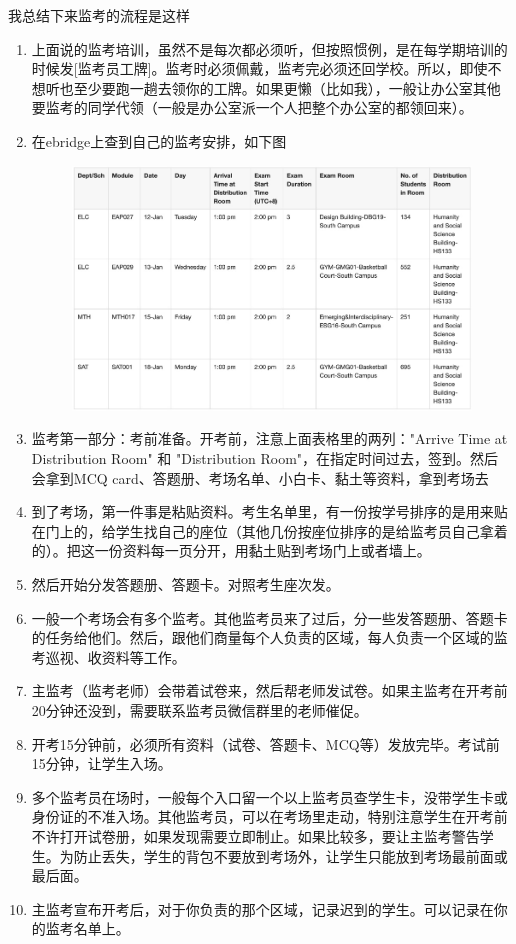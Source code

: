 我总结下来监考的流程是这样
\begin{enumerate}
    \item 上面说的监考培训，虽然不是每次都必须听，但按照惯例，是在每学期培训的时候发[监考员工牌]。监考时必须佩戴，监考完必须还回学校。所以，即使不想听也至少要跑一趟去领你的工牌。如果更懒（比如我），一般让办公室其他要监考的同学代领（一般是办公室派一个人把整个办公室的都领回来）。
    \item 在ebridge上查到自己的监考安排，如下图
        \begin{figure}[H]
            \centering
            \includegraphics[width=0.5\columnwidth]{author-folder/Kai.Wu/invigi-table.jpg}
        \end{figure}
    \item 监考第一部分：考前准备。开考前，注意上面表格里的两列："Arrive Time at Distribution Room" 和 "Distribution Room"，在指定时间过去，签到。然后会拿到MCQ card、答题册、考场名单、小白卡、黏土等资料，拿到考场去
    \item 到了考场，第一件事是粘贴资料。考生名单里，有一份按学号排序的是用来贴在门上的，给学生找自己的座位（其他几份按座位排序的是给监考员自己拿着的）。把这一份资料每一页分开，用黏土贴到考场门上或者墙上。
    \item 然后开始分发答题册、答题卡。对照考生座次发。
    \item 一般一个考场会有多个监考。其他监考员来了过后，分一些发答题册、答题卡的任务给他们。然后，跟他们商量每个人负责的区域，每人负责一个区域的监考巡视、收资料等工作。
    \item 主监考（监考老师）会带着试卷来，然后帮老师发试卷。如果主监考在开考前20分钟还没到，需要联系监考员微信群里的老师催促。
    \item 开考15分钟前，必须所有资料（试卷、答题卡、MCQ等）发放完毕。考试前15分钟，让学生入场。
    \item 多个监考员在场时，一般每个入口留一个以上监考员查学生卡，没带学生卡或身份证的不准入场。其他监考员，可以在考场里走动，特别注意学生在开考前不许打开试卷册，如果发现需要立即制止。如果比较多，要让主监考警告学生。为防止丢失，学生的背包不要放到考场外，让学生只能放到考场最前面或最后面。
    \item 主监考宣布开考后，对于你负责的那个区域，记录迟到的学生。可以记录在你的监考名单上。

\end{enumerate}

